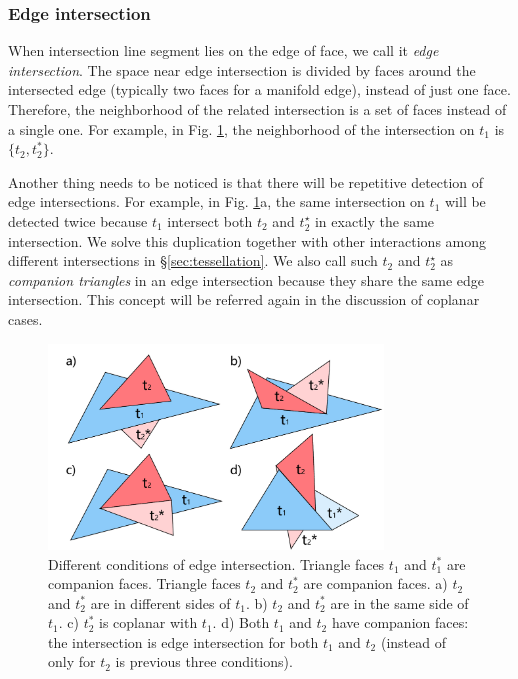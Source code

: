 \documentclass[10pt,journal,compsoc]{IEEEtran}
\begin{document}
\subsubsection{Edge intersection}


When intersection line segment lies on the edge of face, we call it \emph{edge intersection}. The space near edge intersection is divided by faces around the intersected edge (typically two faces for a manifold edge), instead of just one face. Therefore, the neighborhood of the related intersection is a set of faces instead of a single one. For example, in Fig. \ref{fig:twin}, the neighborhood of the intersection on $t_1$ is $\{t_2, t^*_2\}$.

Another thing needs to be noticed is that there will be repetitive detection of edge intersections. For example, in Fig. \ref{fig:twin}a, the same intersection on $t_1$ will be detected twice because $t_1$ intersect both $t_2$ and $t_2^{\star}$ in exactly the same intersection. We solve this duplication together with other interactions among different intersections in \S\ref{sec:tessellation}. We also call such $t_2$ and $t_2^{\star}$ as \emph{companion triangles} in an edge intersection because they share the same edge intersection. This concept will be referred again in the discussion of coplanar cases.

\begin{figure}[t]
\centering
\includegraphics[width=3.5in]{edgeisect}
\caption{Different conditions of edge intersection. Triangle faces $t_1$ and $t_1^*$ are companion faces. Triangle faces $t_2$ and $t_2^*$ are companion faces. a) $t_2$ and $t_2^*$ are in different sides of $t_1$. b) $t_2$ and $t_2^*$ are in the same side of $t_1$. c) $t_2^*$ is coplanar with $t_1$. d) Both $t_1$ and $t_2$ have companion faces: the intersection is edge intersection for both $t_1$ and $t_2$ (instead of only for $t_2$ is previous three conditions). }
\label{fig:twin}
\end{figure}
\end{document}
